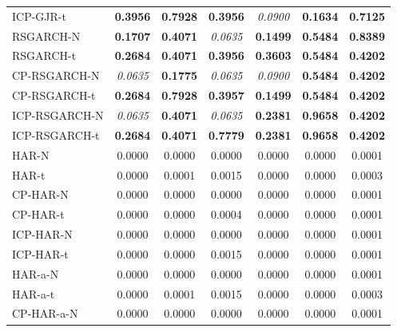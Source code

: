 \documentclass[preprint,12pt,authoryear]{elsarticle}
\begin{document}
\begin{center}
\begin{threeparttable}
\begin{tabular}{l c c c c c c}
ICP-GJR-t             & \textbf{0.3956} & \textbf{0.7928} & \textbf{0.3956} & \textit{0.0900} & \textbf{0.1634} & \textbf{0.7125} \\
RSGARCH-N             & \textbf{0.1707} & \textbf{0.4071} & \textit{0.0635} & \textbf{0.1499} & \textbf{0.5484} & \textbf{0.8389} \\
RSGARCH-t             & \textbf{0.2684} & \textbf{0.4071} & \textbf{0.3956} & \textbf{0.3603} & \textbf{0.5484} & \textbf{0.4202} \\
CP-RSGARCH-N          & \textit{0.0635} & \textbf{0.1775} & \textit{0.0635} & \textit{0.0900} & \textbf{0.5484} & \textbf{0.4202} \\
CP-RSGARCH-t          & \textbf{0.2684} & \textbf{0.7928} & \textbf{0.3957} & \textbf{0.1499} & \textbf{0.5484} & \textbf{0.4202} \\
ICP-RSGARCH-N         & \textit{0.0635} & \textbf{0.4071} & \textit{0.0635} & \textbf{0.2381} & \textbf{0.9658} & \textbf{0.4202} \\
ICP-RSGARCH-t         & \textbf{0.2684} & \textbf{0.4071} & \textbf{0.7779} & \textbf{0.2381} & \textbf{0.9658} & \textbf{0.4202} \\
HAR-N                 & 0.0000          & 0.0000          & 0.0000 & 0.0000          & 0.0000          & 0.0001 \\
HAR-t                 & 0.0000          & 0.0001          & 0.0015 & 0.0000          & 0.0000          & 0.0003 \\
CP-HAR-N              & 0.0000          & 0.0000          & 0.0000 & 0.0000          & 0.0000          & 0.0001 \\
CP-HAR-t              & 0.0000          & 0.0000          & 0.0004 & 0.0000          & 0.0000          & 0.0001 \\
ICP-HAR-N             & 0.0000          & 0.0000          & 0.0000 & 0.0000          & 0.0000          & 0.0001 \\
ICP-HAR-t             & 0.0000          & 0.0000          & 0.0015 & 0.0000          & 0.0000          & 0.0001 \\
HAR-a-N               & 0.0000          & 0.0000          & 0.0000 & 0.0000          & 0.0000          & 0.0001 \\
HAR-a-t               & 0.0000          & 0.0001          & 0.0015 & 0.0000          & 0.0000          & 0.0003 \\
CP-HAR-a-N            & 0.0000          & 0.0000          & 0.0000 & 0.0000          & 0.0000          & 0.0001 \\

\end{tabular}
\end{threeparttable}
\end{center}
\end{document}
